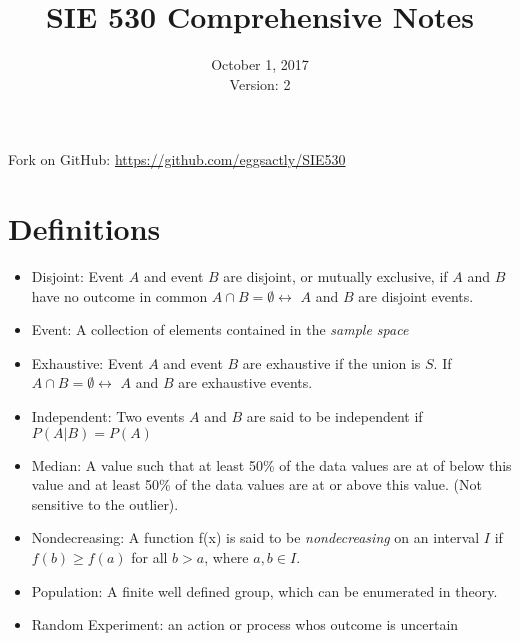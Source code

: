 \documentclass[12pt]{article}
\begin{document}
\title{SIE 530 Comprehensive Notes}
\date{October 1, 2017\\Version: 2}
\maketitle
{\centering

Fork on GitHub: \url{https://github.com/eggsactly/SIE530}\par
}
\section*{Definitions}

\begin{itemize}

\item Disjoint: Event $A$ and event $B$ are disjoint, or mutually exclusive, if $A$ and $B$ have no outcome in common $A \cap B = \emptyset \leftrightarrow$ $A$ and $B$ are disjoint events. \cite[p.18]{classnotes.1}

\item Event: A collection of elements contained in the \emph{sample space} \cite[p.16]{classnotes.1}

\item Exhaustive: Event $A$ and event $B$ are exhaustive if the union is $S$. If $A \cap B = \emptyset \leftrightarrow$ $A$ and $B$ are exhaustive events. \cite[p.18]{classnotes.1}

\item Independent: Two events $A$ and $B$ are said to be independent if $P(A|B)=P(A)$ \cite[p.8]{classnotes.3}

\item Median: A value such that at least 50\% of the data values are at of below this value and at least 50\% of the data values are at or above this value. (Not sensitive to the outlier). \cite[p.9]{classnotes.1}

\item Nondecreasing: A function f(x) is said to be \emph{nondecreasing} on an interval $I$ if $f(b)\geq f(a)$ for all $b>a$, where $a,b \in I$. \cite{wolfram.nondecreasing}

\item Population: A finite well defined group, which can be enumerated in theory. \cite[p.9]{classnotes.1}

\item Random Experiment: an action or process whos outcome is uncertain \cite[p.16]{classnotes.1}


\end{itemize}
\end{document}
